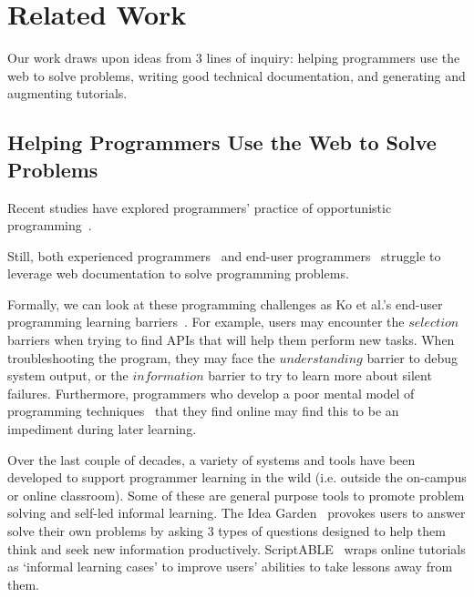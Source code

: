 \section{Related Work}

Our work draws upon ideas from 3 lines of inquiry:
helping programmers use the web to solve problems,
writing good technical documentation,
and generating and augmenting tutorials.

\subsection{Helping Programmers Use the Web to Solve Problems}

Recent studies have explored programmers' practice of opportunistic programming~\cite{brandt_two_2009}\cite{brandt_example-centric_2010}\cite{hartmann_hacking_2008}.

Still, both experienced programmers~\cite{duala-ekoko_asking_2012}\cite{duala-ekoko_information_2010} and end-user programmers~\cite{dorn_lost_2013}\cite{dorn_learning_2010}\cite{rosson_everyday_2004} struggle to leverage web documentation to solve programming problems.

Formally, we can look at these programming challenges as Ko et al.'s end-user programming learning barriers~\cite{ko_six_2004}.
For example, users may encounter the $selection$ barriers when trying to find APIs that will help them perform new tasks.
When troubleshooting the program, they may face the $understanding$ barrier to debug system output, or the $information$ barrier to try to learn more about silent failures.
Furthermore, programmers who develop a poor mental model of programming techniques~\cite{winslow_programming_1996} that they find online may find this to be an impediment during later learning.

Over the last couple of decades, a variety of systems and tools have been developed to support programmer learning in the wild
(i.e. outside the on-campus or online classroom).
Some of these are general purpose tools to promote problem solving and self-led informal learning.
The Idea Garden~\cite{cao_barriers_2012}\cite{cao_end-user_2013} provokes users to answer solve their own problems by asking 3 types of questions designed to help them think and seek new information productively.
ScriptABLE~\cite{dorn_scriptable_2011} wraps online tutorials as `informal learning cases' to improve users' abilities to take lessons away from them. 

